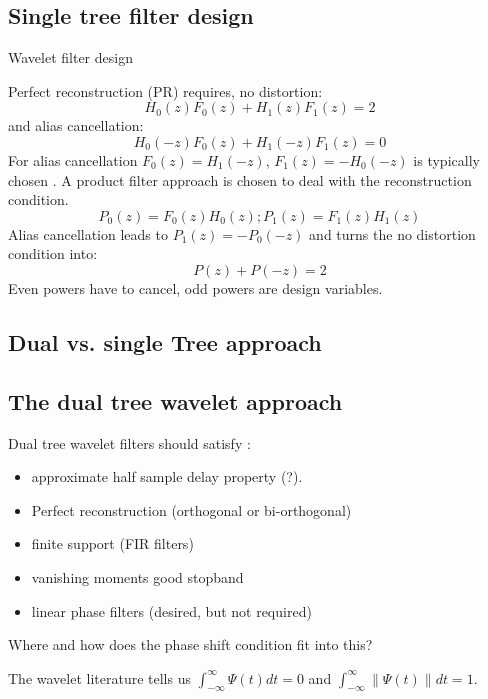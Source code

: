 \documentclass{article}
\begin{document}
\subsection{Single tree filter design}
Wavelet filter design 

Perfect reconstruction (PR) \cite{Selesnick2005}\cite[page 107]{Strang1997} requires, no distortion:
\begin{equation}
H_0(z) F_{0}(z) + H_1(z) F_1(z) = 2
\end{equation}
and alias cancellation:
\begin{equation}
H_0(-z) F_{0}(z) + H_1(-z) F_1(z) = 0
\end{equation}
For alias cancellation $F_0(z) = H_1(-z)$, $F_1(z) = -H_0(-z)$ is typically chosen \cite{Strang1994}. A product filter approach is chosen to deal with the reconstruction condition.
\begin{equation}
P_0(z) = F_0(z)H_0(z); P_1(z) = F_1(z)H_1(z) 
\end{equation}
Alias cancellation leads to $P_1(z) = -P_0(-z)$ and turns the no distortion condition into:
\begin{equation}
P(z) + P(-z) = 2
\end{equation}
Even powers have to cancel, odd powers are design variables.

\subsection{Dual vs. single Tree approach}

\subsection{The dual tree wavelet approach}

Dual tree wavelet filters should satisfy \cite{Selesnick2005}:
\begin{itemize}
\item approximate half sample delay property (?).
\item Perfect reconstruction (orthogonal or bi-orthogonal)
\item finite support (FIR filters)
\item vanishing moments good stopband
\item linear phase filters (desired, but not required)
\end{itemize}

Where and how does the phase shift condition fit into this?

The wavelet literature tells us $\int_{-\infty}^{\infty} \Psi(t) dt = 0$
and $\int_{-\infty}^{\infty} \| \Psi(t) \| dt = 1$.
\end{document}
